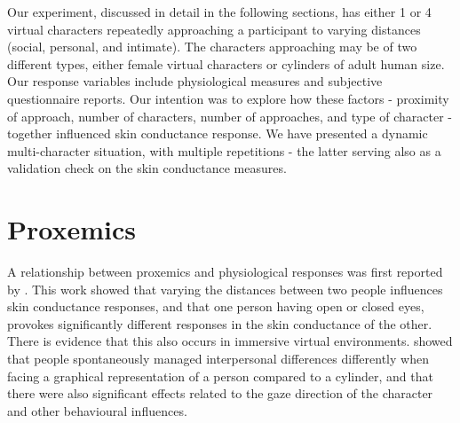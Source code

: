 \documentclass[
		twoside,openright,titlepage,numbers=noenddot,manychapters,
		headinclude,%
                footinclude=false,cleardoublepage=empty,
                BCOR=5mm,
		fontsize=11pt, %
                 enabledeprecatedfontcommands]{scrreprt}
\begin{document}
Our experiment, discussed in detail in the following sections, has either 1 or 4 virtual characters repeatedly approaching a participant to varying distances (social, personal, and intimate). The characters approaching may be of two different types, either female virtual characters or cylinders of adult human size. Our response variables include physiological measures and subjective questionnaire reports. Our intention was to explore how these factors - proximity of approach, number of characters, number of approaches, and type of character - together influenced skin conductance response. We have presented a dynamic multi-character situation, with multiple repetitions - the latter serving also as a validation check on the skin conductance measures.

\section{Proxemics}

A relationship between proxemics and physiological responses was first reported by \cite{mcbride65}. This work showed that varying the distances between two people influences skin conductance responses, and that one person having open or closed eyes, provokes significantly different responses in the skin conductance of the other. There is evidence that this also occurs in immersive virtual environments. \cite{bailenson2001etr} showed that people spontaneously managed interpersonal differences differently when facing a graphical representation of a person compared to a cylinder, and that there were also significant effects related to the gaze direction of the character and other behavioural influences.
\end{document}
